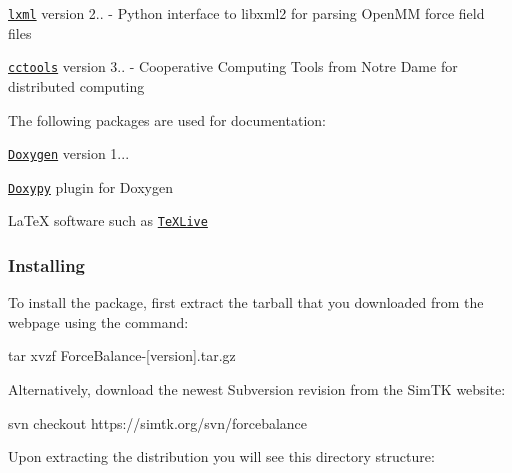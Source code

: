 \begin{DoxyItemize}
\item \href{http://lxml.de/}{\tt lxml} version 2.. -\/ \-Python interface to libxml2 for parsing \-Open\-M\-M force field files \item \href{http://nd.edu/~ccl/software/}{\tt cctools} version 3.. -\/ \-Cooperative \-Computing \-Tools from \-Notre \-Dame for distributed computing\end{DoxyItemize}
\-The following packages are used for documentation\-:

\begin{DoxyItemize}
\item \href{http://www.stack.nl/~dimitri/doxygen/}{\tt \-Doxygen} version 1... \item \href{http://code.foosel.org/doxypy}{\tt \-Doxypy} plugin for \-Doxygen \item \-La\-Te\-X software such as \href{http://www.tug.org/texlive/}{\tt \-Te\-X\-Live}\end{DoxyItemize}
\hypertarget{installation_installing_forcebalance_install}{}\subsubsection{\-Installing}\label{installation_installing_forcebalance_install}
\-To install the package, first extract the tarball that you downloaded from the webpage using the command\-:

\begin{DoxyVerb}tar xvzf ForceBalance-[version].tar.gz \end{DoxyVerb}


\-Alternatively, download the newest \-Subversion revision from the \-Sim\-T\-K website\-:

\begin{DoxyVerb}svn checkout https://simtk.org/svn/forcebalance \end{DoxyVerb}


\-Upon extracting the distribution you will see this directory structure\-:

